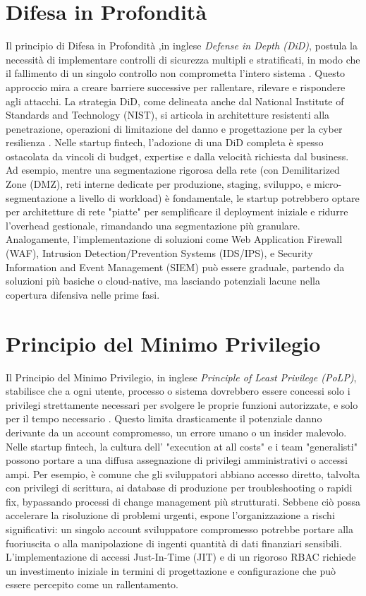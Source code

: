 \section{Difesa in Profondità}
Il principio di Difesa in Profondità ,in inglese \textit{Defense in Depth (DiD)}, postula la necessità di implementare controlli di sicurezza multipli e stratificati, in modo che il fallimento di un singolo controllo non comprometta l'intero sistema \cite{NIST_SP_800_53}. Questo approccio mira a creare barriere successive per rallentare, rilevare e rispondere agli attacchi. La strategia DiD, come delineata anche dal National Institute of Standards and Technology (NIST), si articola in architetture resistenti alla penetrazione, operazioni di limitazione del danno e progettazione per la cyber resilienza \cite{NIST_SP_800_172}.
Nelle startup fintech, l'adozione di una DiD completa è spesso ostacolata da vincoli di budget, expertise e dalla velocità richiesta dal business. Ad esempio, mentre una segmentazione rigorosa della rete (con Demilitarized Zone (DMZ), reti interne dedicate per produzione, staging, sviluppo, e micro-segmentazione a livello di workload) è fondamentale, le startup potrebbero optare per architetture di rete "piatte" per semplificare il deployment iniziale e ridurre l'overhead gestionale, rimandando una segmentazione più granulare. Analogamente, l'implementazione di soluzioni come Web Application Firewall (WAF), Intrusion Detection/Prevention Systems (IDS/IPS), e Security Information and Event Management (SIEM) può essere graduale, partendo da soluzioni più basiche o cloud-native, ma lasciando potenziali lacune nella copertura difensiva nelle prime fasi.
\section{Principio del Minimo Privilegio}
Il Principio del Minimo Privilegio, in inglese \textit{Principle of Least Privilege (PoLP)}, stabilisce che a ogni utente, processo o sistema dovrebbero essere concessi solo i privilegi strettamente necessari per svolgere le proprie funzioni autorizzate, e solo per il tempo necessario \cite{NIST_Glossary}. Questo limita drasticamente il potenziale danno derivante da un account compromesso, un errore umano o un insider malevolo.
Nelle startup fintech, la cultura dell' "execution at all costs" e i team "generalisti" possono portare a una diffusa assegnazione di privilegi amministrativi o accessi ampi. Per esempio, è comune che gli sviluppatori abbiano accesso diretto, talvolta con privilegi di scrittura, ai database di produzione per troubleshooting o rapidi fix, bypassando processi di change management più strutturati. Sebbene ciò possa accelerare la risoluzione di problemi urgenti, espone l'organizzazione a rischi significativi: un singolo account sviluppatore compromesso potrebbe portare alla fuoriuscita o alla manipolazione di ingenti quantità di dati finanziari sensibili. L'implementazione di accessi Just-In-Time (JIT) e di un rigoroso RBAC richiede un investimento iniziale in termini di progettazione e configurazione che può essere percepito come un rallentamento.
